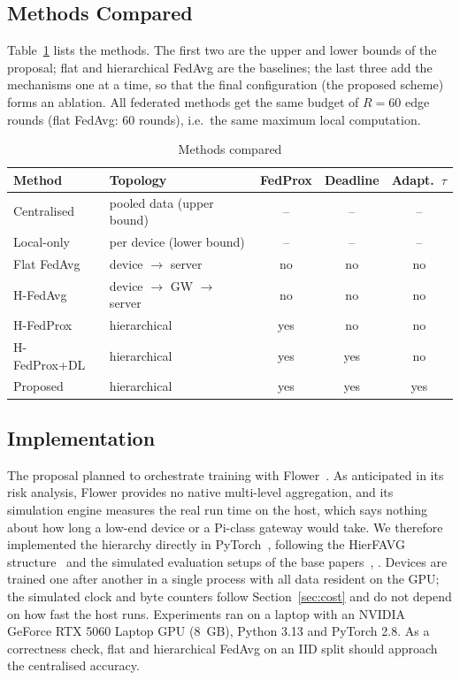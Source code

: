 \documentclass[conference]{IEEEtran}
\begin{document}
\subsection{Methods Compared}
Table~\ref{tab:methods} lists the methods. The first two are the upper and lower bounds of the proposal; flat and hierarchical FedAvg are the baselines; the last three add the mechanisms one at a time, so that the final configuration (the proposed scheme) forms an ablation. All federated methods get the same budget of $R = 60$ edge rounds (flat FedAvg: 60 rounds), i.e.\ the same maximum local computation.

\begin{table}[t]
\centering
\caption{Methods compared}
\label{tab:methods}
\footnotesize
\setlength{\tabcolsep}{2.5pt}
\begin{tabular}{@{}llccc@{}}
\toprule
\textbf{Method} & \textbf{Topology} & \textbf{FedProx} & \textbf{Deadline} & \textbf{Adapt.\ $\tau$} \\
\midrule
Centralised & pooled data (upper bound) & -- & -- & -- \\
Local-only & per device (lower bound) & -- & -- & -- \\
Flat FedAvg & device $\rightarrow$ server & no & no & no \\
H-FedAvg & device $\rightarrow$ GW $\rightarrow$ server & no & no & no \\
H-FedProx & hierarchical & yes & no & no \\
H-FedProx+DL & hierarchical & yes & yes & no \\
Proposed & hierarchical & yes & yes & yes \\
\bottomrule
\end{tabular}
\end{table}

\subsection{Implementation}
The proposal planned to orchestrate training with Flower~\cite{beutel2020flower}. As anticipated in its risk analysis, Flower provides no native multi-level aggregation, and its simulation engine measures the real run time on the host, which says nothing about how long a low-end device or a Pi-class gateway would take. We therefore implemented the hierarchy directly in PyTorch~\cite{paszke2019pytorch}, following the HierFAVG structure~\cite{liu2020} and the simulated evaluation setups of the base papers~\cite{luo2024}, \cite{fang2024mtgc}. Devices are trained one after another in a single process with all data resident on the GPU; the simulated clock and byte counters follow Section~\ref{sec:cost} and do not depend on how fast the host runs. Experiments ran on a laptop with an NVIDIA GeForce RTX 5060 Laptop GPU (8~GB), Python 3.13 and PyTorch 2.8. As a correctness check, flat and hierarchical FedAvg on an IID split should approach the centralised accuracy.
\end{document}
